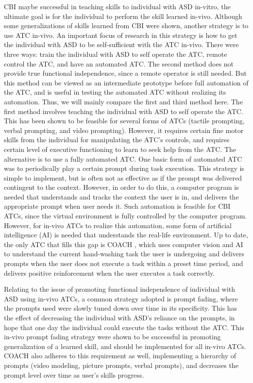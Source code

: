 \documentclass{ut-thesis}
\begin{document}
CBI maybe successful in teaching skills to individual with ASD in-vitro, the ultimate goal is for the individual to perform the skill learned in-vivo.  Although some generalizations of skills learned from CBI were shown, another strategy is to use ATC in-vivo.  An important focus of research in this strategy is how to get the individual with ASD to be self-sufficient with the ATC in-vivo.  There were three ways: train the individual with ASD to self operate the ATC, remote control the ATC, and have an automated ATC.  The second method does not provide true functional independence, since a remote operator is still needed.  But this method can be viewed as an intermediate prototype before full automation of the ATC, and is useful in testing the automated ATC without realizing its automation.  Thus, we will mainly compare the first and third method here.  The first method involves teaching the individual with ASD to self operate the ATC.  This has been shown to be feasible for several forms of ATCs (tactile prompting, verbal prompting, and video prompting).  However, it requires certain fine motor skills from the individual for manipulating the ATC's controls, and requires certain level of executive functioning to learn to seek help from the ATC.  The alternative is to use a fully automated ATC.  One basic form of automated ATC was to periodically play a certain prompt during task execution.  This strategy is simple to implement, but is often not as effective as if the prompt was delivered contingent to the context.  However, in order to do this, a computer program is needed that understands and tracks the context the user is in, and delivers the appropriate prompt when user needs it.  Such automation is feasible for CBI ATCs, since the virtual environment is fully controlled by the computer program.  However, for in-vivo ATCs to realize this automation, some form of artificial intelligence (AI) is needed that understands the real-life environment.  Up to date, the only ATC that fills this gap is COACH \cite{bimbrahw2012investigating}, which uses computer vision and AI to understand the current hand-washing task the user is undergoing and delivers prompts when the user does not execute a task within a preset time period, and delivers positive reinforcement when the user executes a task correctly.

Relating to the issue of promoting functional independence of individual with ASD using in-vivo ATCs, a common strategy adopted is prompt fading, where the prompts used were slowly tuned down over time in its specificity.  This has the effect of decreasing the individual with ASD's reliance on the prompts, in hope that one day the individual could execute the tasks without the ATC.  This in-vivo prompt fading strategy were shown to be successful in promoting generalization of a learned skill, and should be implemented for all in-vivo ATCs.  COACH also adheres to this requirement as well, implementing a hierarchy of prompts (video modeling, picture prompts, verbal prompts), and decreases the prompt level over time as user's skills progress.
\end{document}
